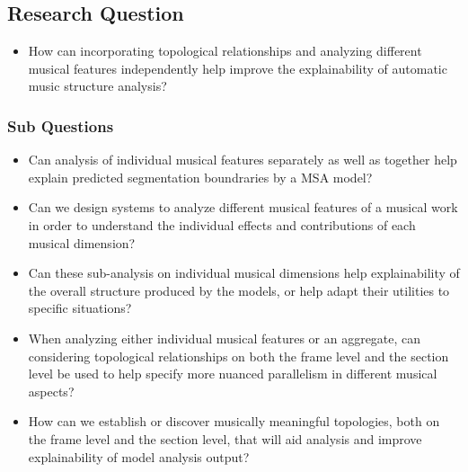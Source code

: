 \subsection{Research Question}
\begin{itemize}
	\item How can incorporating topological relationships and analyzing different musical features independently help improve the explainability of automatic music structure analysis?
\end{itemize}

\subsubsection{Sub Questions}
\begin{itemize}
	\item Can analysis of individual musical features separately as well as together help explain predicted segmentation boundraries by a MSA model?
	\item Can we design systems to analyze different musical features of a musical work in order to understand the individual effects and contributions of each musical dimension? 
	\item Can these sub-analysis on individual musical dimensions help explainability of the overall structure produced by the models, or help adapt their utilities to specific situations?
	\item When analyzing either individual musical features or an aggregate, can considering topological relationships on both the frame level and the section level be used to help specify more nuanced parallelism in different musical aspects?
	\item How can we establish or discover musically meaningful topologies, both on the frame level and the section level, that will aid analysis and improve explainability of model analysis output?
\end{itemize}